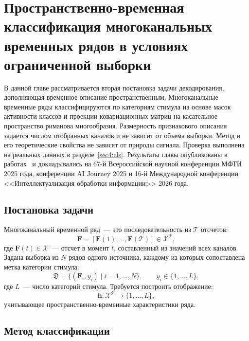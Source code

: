 \chapter{Пространственно-временная классификация многоканальных временных рядов в условиях ограниченной выборки}\label{ch:cls}

В данной главе рассматривается вторая постановка задачи декодирования, дополняющая временное описание пространственным. Многоканальные временные ряды классифицируются по категориям стимула на основе масок активности классов и проекции ковариационных матриц на касательное пространство риманова многообразия. Размерность признакового описания задается числом отобранных каналов и не зависит от объема выборки. Метод и его теоретические свойства не зависят от природы сигнала. Проверка выполнена на реальных данных в разделе~\ref{sec4:cls}. Результаты главы опубликованы в работах~\cite{dorin2025enhancing, dorin2025conf67mipt, dorin2026ioi} и докладывались на 67-й Всероссийской научной конференции МФТИ 2025 года, конференции AI Journey 2025 и 16-й Международной конференции <<Интеллектуализация обработки информации>> 2026 года.

\section{Постановка задачи}\label{sec2:cls}

Многоканальный временной ряд~--- это последовательность из $\mathcal{T}$ отсчетов:
\begin{equation*}
\mathbf{F} = [\mathbf{F}(1), \ldots, \mathbf{F}(\mathcal{T})] \in \mathcal{X}^{\mathcal{T}},
\end{equation*}
где $\mathbf{F}(t) \in \mathcal{X}$~--- отсчет в момент $t$, составленный из значений всех каналов. Задана выборка из $N$ рядов одного источника, каждому из которых сопоставлена метка категории стимула:
\begin{equation}\label{eq:cls_dataset}
\mathfrak{D} = \{(\mathbf{F}_i, y_i) \mid i = 1, \ldots, N\}, \qquad y_i \in \{1, \ldots, L\},
\end{equation}
где $L$~--- число категорий стимула. Требуется построить отображение:
\begin{equation}\label{eq:cls_target}
\mathbf{h}: \mathcal{X}^{\mathcal{T}} \to \{1, \ldots, L\},
\end{equation}
учитывающее пространственно-временные характеристики ряда.

\section{Метод классификации}\label{sec3:cls}

